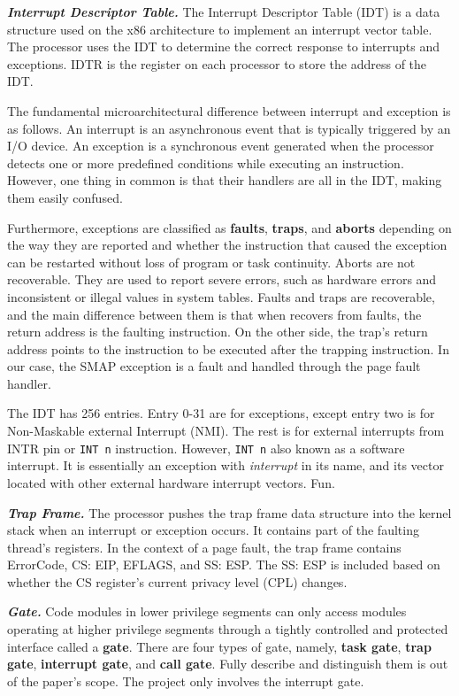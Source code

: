 \textbf{\textit{Interrupt Descriptor Table.}} The Interrupt Descriptor Table (IDT) is a data structure used on the x86 architecture to implement an interrupt vector table. The processor uses the IDT to determine the correct response to interrupts and exceptions. IDTR is the register on each processor to store the address of the IDT.


The fundamental microarchitectural difference between interrupt and exception is as follows.  An interrupt is an asynchronous event
that is typically triggered by an I/O device. An exception is a
synchronous event generated when the processor detects one
or more predefined conditions while executing an instruction. However, one thing in common is that their handlers are all in the IDT, making them easily confused.

Furthermore, exceptions are classified as \textbf{faults}, \textbf{traps}, and \textbf{aborts} depending on the way they are reported and whether the instruction that caused the exception can be restarted without loss of program or task continuity. Aborts are not recoverable. They are used to report severe errors, such as hardware errors and inconsistent or illegal values in system tables. Faults and traps are recoverable, and the main difference between them is that when recovers from faults, the return address is the faulting instruction. On the other side, the trap's return address points to the instruction to be executed after the trapping instruction. In our case, the SMAP exception is a fault and handled through the page fault handler.

The IDT has 256 entries. Entry 0-31 are for exceptions, except entry two is for Non-Maskable external Interrupt (NMI). The rest is for external interrupts from INTR pin or \texttt{INT n} instruction. However, \texttt{INT n} also known as a software interrupt. It is essentially an exception with \textit{interrupt} in its name, and its vector located with other external hardware interrupt vectors. Fun.



\textbf{\textit{Trap Frame.}}  The processor pushes the trap frame data structure into the kernel stack when an interrupt or exception occurs.
It contains part of the faulting thread's registers. In the context of a page fault, the trap frame contains ErrorCode, CS: EIP, EFLAGS, and SS: ESP. The SS: ESP is included based on whether the CS register's current privacy level (CPL) changes. 



\textbf{\textit{Gate.}} Code modules in lower privilege segments can only access modules operating at higher privilege segments through a tightly controlled and protected interface called a \textbf{gate}.  There are four types of gate, namely, \textbf{task gate}, \textbf{trap gate}, \textbf{interrupt gate}, and \textbf{call gate}. Fully describe and distinguish them is out of the paper's scope. The project only involves the interrupt gate.

